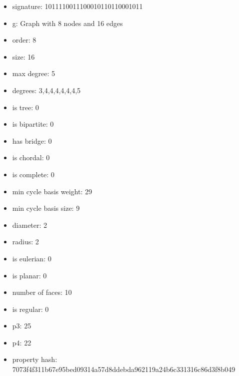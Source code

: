 \begin{itemize}
\item signature: 1011110011100010110110001011
\item g: Graph with 8 nodes and 16 edges
\item order: 8
\item size: 16
\item max degree: 5
\item degrees: 3,4,4,4,4,4,4,5
\item is tree: 0
\item is bipartite: 0
\item has bridge: 0
\item is chordal: 0
\item is complete: 0
\item min cycle basis weight: 29
\item min cycle basis size: 9
\item diameter: 2
\item radius: 2
\item is eulerian: 0
\item is planar: 0
\item number of faces: 10
\item is regular: 0
\item p3: 25
\item p4: 22
\item property hash: 7073f4f311b67e95bed09314a57d8ddebda962119a24b6c331316c86d3f8b049
\end{itemize}
\newpage
\begin{figure}
\end{figure}
